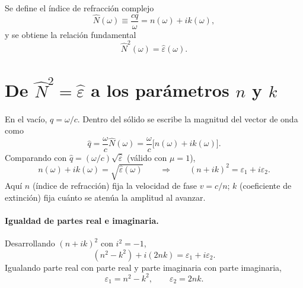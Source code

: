 Se define el \'indice de refracci\'on complejo
\begin{equation}
\label{eq:N-def}
\hat N(\omega)\equiv\frac{cq}{\omega}=n(\omega)+ik(\omega),
\end{equation}
y se obtiene la relaci\'on fundamental
\begin{equation}
\label{eq:N2-eps}
\hat N^{2}(\omega)=\hat\varepsilon(\omega).
\end{equation}

\section{De \texorpdfstring{$\hat N^{2}=\hat\varepsilon$}{N2=eps} a los par\'ametros \texorpdfstring{$n$}{n} y \texorpdfstring{$k$}{k}}

En el vac\'io, $q=\omega/c$.
Dentro del s\'olido se escribe la magnitud del vector de onda como
\begin{equation}
\hat q=\frac{\omega}{c}\hat N(\omega)=\frac{\omega}{c}\bigl[n(\omega)+ik(\omega)\bigr].
\end{equation}
Comparando con $\hat q=(\omega/c)\sqrt{\hat\varepsilon}$ (v\'alido con $\mu=1$),
\begin{equation}
n(\omega)+ik(\omega)=\sqrt{\hat\varepsilon(\omega)}
\qquad\Longrightarrow\qquad
(n+ik)^{2}=\varepsilon_1+i\varepsilon_2.
\end{equation}
Aqu\'i $n$ (\'indice de refracci\'on) fija la velocidad de fase $v=c/n$;
$k$ (coeficiente de extinci\'on) fija cu\'anto se aten\'ua la amplitud al avanzar.

\paragraph{Igualdad de partes real e imaginaria.}
Desarrollando $(n+ik)^{2}$ con $i^{2}=-1$,
\begin{equation}
(n^{2}-k^{2})+i(2nk)=\varepsilon_1+i\varepsilon_2.
\end{equation}
Igualando parte real con parte real y parte imaginaria con parte imaginaria,
\begin{equation}
\label{eq:eps-nk}
\varepsilon_1=n^{2}-k^{2},\qquad
\varepsilon_2=2nk.
\end{equation}

